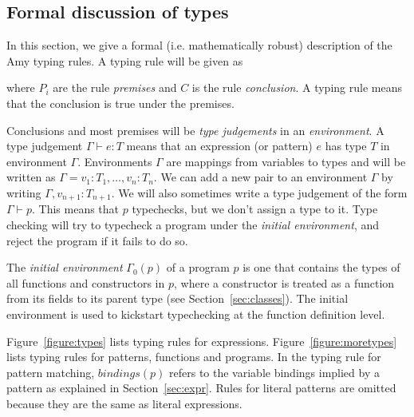 \subsection{Formal discussion of types}

\newcommand{\hastype}[2]{\Gamma \vdash #1: #2}

In this section, we give a formal (i.e. mathematically robust) description of the Amy typing rules.
A typing rule will be given as
\begin{mathpar}
\end{mathpar}

\noindent where $P_i$ are the rule \emph{premises} and $C$ is the rule \emph{conclusion}.
A typing rule means that the conclusion is true under the premises.

Conclusions and most premises will be \emph{type judgements} in an \emph{environment}.
A type judgement $\hastype{e}{T}$ means that an expression (or pattern) $e$ has type $T$
in environment $\Gamma$.
Environments $\Gamma$ are mappings from variables to types and will be written as
\hbox{$\Gamma = v_1: T_1, \ldots, v_n: T_n$}. We can add a new pair to an environment $\Gamma$
by writing $\Gamma, v_{n+1}: T_{n+1}$.
We will also sometimes write a type judgement of the form $\Gamma \vdash p$.
This means that $p$ typechecks, but we don't assign a type to it.
Type checking will try to typecheck a program under the \emph{initial environment},
and reject the program if it fails to do so.

The \emph{initial environment} $\Gamma_0(p)$ of a program $p$ is one
that contains the types of all functions and constructors in $p$,
where a constructor is treated as a function from its fields to its parent type
(see Section~\ref{sec:classes}).
The initial environment is used to kickstart typechecking at the function definition level.

Figure~\ref{figure:types} lists typing rules for expressions.
Figure~\ref{figure:moretypes} lists typing rules for patterns, functions and programs.
In the typing rule for pattern matching,
$bindings(p)$ refers to the variable bindings implied by a pattern as explained in Section~\ref{sec:expr}.
Rules for literal patterns are omitted because they are the same as literal expressions.

